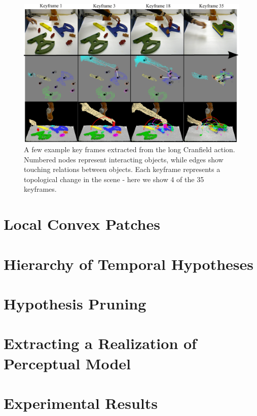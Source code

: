 \begin{figure}[ht!]
  \centering
  \includegraphics[scale=0.84]{figures/IROS2013/SECKF.pdf}
  \caption[Cranfield Key Frames]{A few example key frames extracted from the long Cranfield action. Numbered nodes represent interacting objects, while edges show touching relations between objects. Each keyframe represents a topological change in the scene - here we show 4 of the 35 keyframes.}
  \label{fig:SECGraphs}
\end{figure}



\section{Local Convex Patches}
\section{Hierarchy of Temporal Hypotheses}
\section{Hypothesis Pruning}
\section{Extracting a Realization of Perceptual Model}
\section{Experimental Results}




